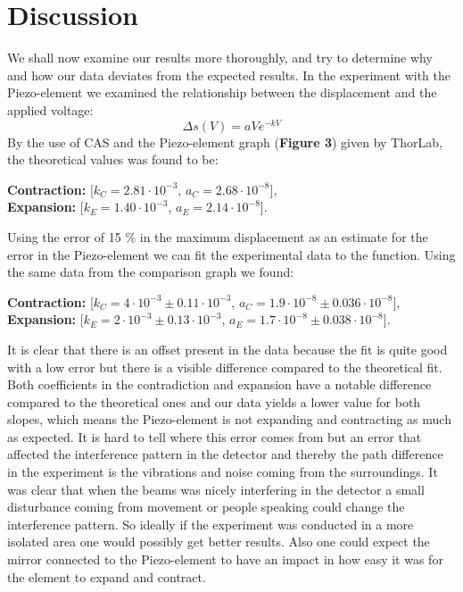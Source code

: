 \documentclass[working, oneside]{inputs/tuftebook}
\begin{document}
\section*{Discussion}
We shall now examine our results more thoroughly, and try to determine why and how our data deviates from the expected results. In the experiment with the Piezo-element we examined the relationship between the displacement and the applied voltage:
\[
\Delta s \left( V \right)  = aV e^{-kV}
\]
By the use of CAS and the Piezo-element graph (\textbf{Figure 3}) given by ThorLab, the theoretical values was found to be:
\begin{center}

\textbf{Contraction: }[$k_C = 2.81\cdot 10^{-3}$,  $a_C = 2.68 \cdot 10^{-8}$], 
\\
\textbf{Expansion: }[$k_E = 1.40 \cdot 10^{-3}$, $a_E = 2.14 \cdot 10^{-8}$].
\end{center}
Using the error of 15 \% in the maximum displacement   as an estimate for the error in the Piezo-element we can fit the experimental data to the function. Using the same data from the comparison graph we found:
\begin{center}
\textbf{Contraction: }[$k_C = 4\cdot 10^{-3} \pm 0.11 \cdot 10^{-3}$,  $a_C = 1.9 \cdot 10^{-8} \pm 0.036 \cdot 10^{-8}$], 
\\
\textbf{Expansion: }[$k_E = 2 \cdot 10^{-3} \pm 0.13 \cdot 10^{-3}$, $a_E = 1.7 \cdot 10^{-8} \pm 0.038 \cdot 10^{-8}$].
\end{center}

It is clear that there is an offset present in the data because the fit is quite good with a low error but there is a visible difference compared to the theoretical fit. Both coefficients in the contradiction and expansion have a notable difference compared to the theoretical ones and our data yields a lower value for both slopes, which means the Piezo-element is not expanding and contracting as much as expected. It is hard to tell where this error comes from but an error that affected the interference pattern in the detector and thereby the path difference in the experiment is the vibrations and noise coming from the surroundings. It was clear that when the beams was nicely interfering in the detector a small disturbance coming from movement or people speaking could change the interference pattern. So ideally if the experiment was conducted in a more isolated area one would possibly get better results. Also one could expect the mirror connected to the Piezo-element to have an impact in how easy it was for the element to expand and contract.
\medskip
\end{document}

